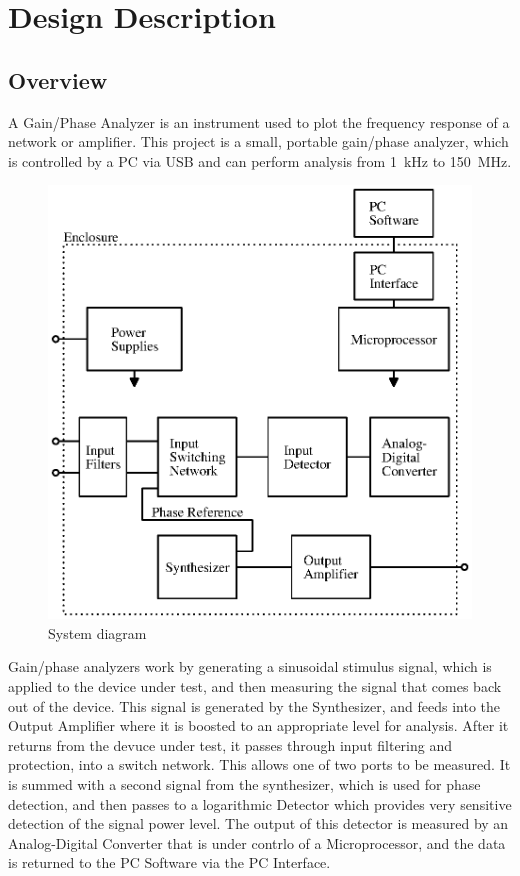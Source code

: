 \chapter{Design Description}

\section{Overview}
A Gain/Phase Analyzer is an instrument used to plot the frequency response of a
network or amplifier. This project is a small, portable gain/phase analyzer, which
is controlled by a PC via USB and can perform analysis from 1~kHz to 150~MHz.

\begin{figure}[H]
\centering
\includegraphics[width=5in]{systemdiagram}
\caption{System diagram}
\label{fig:sysdiag-dd}
\end{figure}

Gain/phase analyzers work by generating a sinusoidal stimulus signal, which is
applied to the device under test, and then measuring the signal that comes back
out of the device. This signal is generated by the Synthesizer, and feeds into
the Output Amplifier where it is boosted to an appropriate level for analysis.
After it returns from the devuce under test, it passes through input filtering
and protection, into a switch network. This allows one of two ports to be measured.
It is summed with a second signal from the synthesizer, which is used for phase
detection, and then passes to a logarithmic Detector which provides very sensitive
detection of the signal power level. The output of this detector is measured by an
Analog-Digital Converter that is under contrlo of a Microprocessor, and the data
is returned to the PC Software via the PC Interface.

